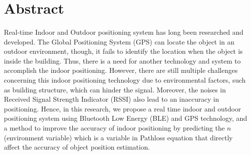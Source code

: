 \section*{\LARGE \centering Abstract}
\vspace{20pt}

\paragraph{}Real-time Indoor and Outdoor positioning system has long been researched and developed. The Global Positioning System (GPS) can locate the object in an outdoor environment, though, it fails to identify the location when the object is inside the building. Thus, there is a need for another technology and system to accomplish the indoor positioning. However, there are still multiple challenges concerning this indoor positioning technology due to environmental factors, such as building structure, which can hinder the signal. Moreover, the noises in Received Signal Strength Indicator (RSSI) also lead to an inaccuracy in positioning. Hence, in this research, we propose a real time indoor and outdoor positioning system using Bluetooth Low Energy (BLE) and GPS technology, and a method to improve the accuracy of indoor positioning by predicting the $n$ (environment variable) which is a variable in Pathloss equation that directly affect the accuracy of object position estimation. 
\thispagestyle{empty}
